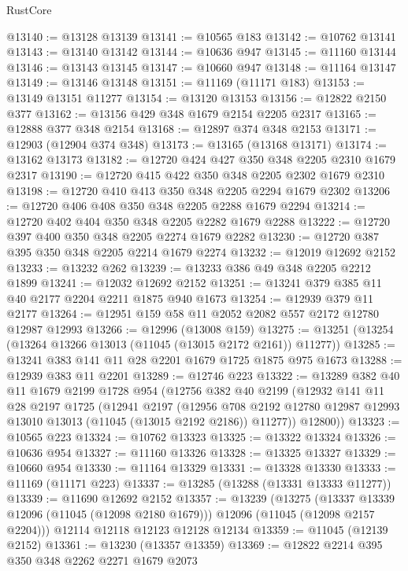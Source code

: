 \begin{lexlean}{RustCore}
\begin{coremodule}
@13140 := @13128 @13139
@13141 := @10565 @183
@13142 := @10762 @13141
@13143 := @13140 @13142
@13144 := @10636 @947
@13145 := @11160 @13144
@13146 := @13143 @13145
@13147 := @10660 @947
@13148 := @11164 @13147
@13149 := @13146 @13148
@13151 := @11169 (@11171 @183)
@13153 := @13149 @13151 @11277
@13154 := @13120 @13153
@13156 := @12822 @2150 @377
@13162 := @13156 @429 @348 @1679 @2154 @2205 @2317
@13165 := @12888 @377 @348 @2154
@13168 := @12897 @374 @348 @2153
@13171 := @12903 (@12904 @374 @348)
@13173 := @13165 (@13168 @13171)
@13174 := @13162 @13173
@13182 := @12720 @424 @427 @350 @348 @2205 @2310 @1679 @2317
@13190 := @12720 @415 @422 @350 @348 @2205 @2302 @1679 @2310
@13198 := @12720 @410 @413 @350 @348 @2205 @2294 @1679 @2302
@13206 := @12720 @406 @408 @350 @348 @2205 @2288 @1679 @2294
@13214 := @12720 @402 @404 @350 @348 @2205 @2282 @1679 @2288
@13222 := @12720 @397 @400 @350 @348 @2205 @2274 @1679 @2282
@13230 := @12720 @387 @395 @350 @348 @2205 @2214 @1679 @2274
@13232 := @12019 @12692 @2152
@13233 := @13232 @262
@13239 := @13233 @386 @49 @348 @2205 @2212 @1899
@13241 := @12032 @12692 @2152
@13251 := @13241 @379 @385 @11 @40 @2177 @2204 @2211 @1875 @940 @1673
@13254 := @12939 @379 @11 @2177
@13264 := @12951 @159 @58 @11 @2052 @2082 @557 @2172 @12780 @12987 @12993
@13266 := @12996 (@13008 @159)
@13275 := @13251 (@13254 (@13264 @13266 @13013 (@11045 (@13015 @2172 @2161)) @11277))
@13285 := @13241 @383 @141 @11 @28 @2201 @1679 @1725 @1875 @975 @1673
@13288 := @12939 @383 @11 @2201
@13289 := @12746 @223
@13322 := @13289
    @382
    @40
    @11
    @1679
    @2199
    @1728
    @954
    (@12756
      @382
      @40
      @2199
      (@12932
        @141
        @11
        @28
        @2197
        @1725
        (@12941
          @2197
          (@12956
            @708
            @2192
            @12780
            @12987
            @12993
            @13010
            @13013
            (@11045 (@13015 @2192 @2186))
            @11277))
        @12800))
@13323 := @10565 @223
@13324 := @10762 @13323
@13325 := @13322 @13324
@13326 := @10636 @954
@13327 := @11160 @13326
@13328 := @13325 @13327
@13329 := @10660 @954
@13330 := @11164 @13329
@13331 := @13328 @13330
@13333 := @11169 (@11171 @223)
@13337 := @13285 (@13288 (@13331 @13333 @11277))
@13339 := @11690 @12692 @2152
@13357 := @13239
    (@13275
      (@13337 @13339 @12096 (@11045 (@12098 @2180 @1679)))
      @12096
      (@11045 (@12098 @2157 @2204)))
    @12114
    @12118
    @12123
    @12128
    @12134
@13359 := @11045 (@12139 @2152)
@13361 := @13230 (@13357 @13359)
@13369 := @12822 @2214 @395 @350 @348 @2262 @2271 @1679 @2073

\end{coremodule}
\end{lexlean}

